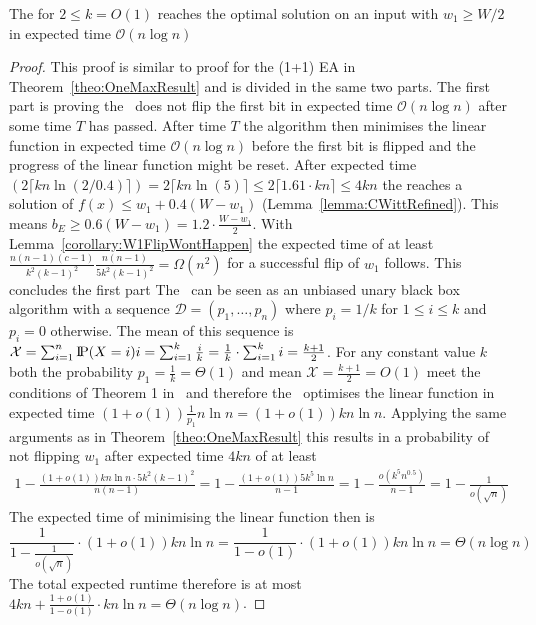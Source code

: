 \begin{lemma}\label{lemma:RLSRoneMaxInput}
    The \RLSR[k] for $2\le k=O(1)$ reaches the optimal solution on an input with $w_1\ge W/2$ in expected time $\mathcal{O}(n\log{}n)$
\end{lemma}
\begin{proof}
    This proof is similar to proof for the (1+1) EA in Theorem~\ref{theo:OneMaxResult} and is divided in the same two parts.
    The first part is proving the \RLSR~does not flip the first bit in expected time $\mathcal{O}(n\log{}n)$ after some time $T$ has passed.
    After time $T$ the algorithm then minimises the linear function in expected time $\mathcal{O}(n\log{}n)$ before the first bit is flipped and the progress of the linear function might be reset.
    After expected time $(2\lceil kn\ln(2/0.4)\rceil)=2\lceil kn\ln(5)\rceil\le2\lceil 1.61\cdot kn\rceil\le4kn$ the \RLSR[k] reaches a solution of \(f(x)\le w_1+0.4(W-w_1)\) (Lemma~\ref{lemma:CWittRefined}).
    This means \(b_E \ge 0.6(W-w_1) = 1.2\cdot\frac{W-w_1}{2}\).
    With Lemma~\ref{corollary:W1FlipWontHappen} the expected time of at least \(\frac{n(n-1)(c-1)}{k^2{(k-1)}^2}\frac{n(n-1)}{5k^2{(k-1)}^2}=\Omega(n^2)\) for a successful flip of $w_1$ follows. This concludes the first part\newline
    The \RLSR~can be seen as an unbiased unary black box algorithm with a sequence $\mathcal{D}=(p_1,\dots,p_n)$ where $p_i=1/k$ for $1\le i\le k$ and $p_i=0$ otherwise.
    The mean of this sequence is \(\mathcal{X}=\sum_{i=1}^{n}{\text{I\kern-0.15em P}(X=i)i}=\sum_{i=1}^{k}{\frac{i}{k}}=\frac{1}{k}\cdot\sum_{i=1}^{k}{i}=\frac{k+1}{2}\).
    For any constant value $k$ both the probability $p_1=\frac{1}{k}=\Theta(1)$ and mean $\mathcal{X}=\frac{k+1}{2}=O(1)$ meet the conditions of Theorem 1 in~\cite{doerr2023tight} and therefore the \RLSR~optimises the linear function in expected time \((1+o(1))\frac{1}{p_1}n\ln n=(1+o(1))kn\ln n\).
    Applying the same arguments as in Theorem~\ref{theo:OneMaxResult} this results in a probability of not flipping $w_1$ after expected time $4kn$ of at least
    \begin{gather}\nonumber
        1-\frac{(1+o(1))kn\ln n\cdot5k^2{(k-1)}^2}{n(n-1)}
        =1-\frac{(1+o(1))5k^5\ln n}{n-1}
        =1-\frac{o(k^5n^{0.5})}{n-1}
        =1-\frac{1}{o(\sqrt{n})}
    \end{gather}
    The expected time of minimising the linear function then is
    \[\frac{1}{1-\frac{1}{o(\sqrt{n})}}\cdot(1+o(1))kn\ln n=\frac{1}{1-o(1)}\cdot(1+o(1))kn\ln n=\Theta(n\log{}n)\]
    The total expected runtime therefore is at most $4kn+\frac{1+o(1)}{1-o(1)}\cdot kn\ln n=\Theta(n\log{}n)$.
\end{proof}

